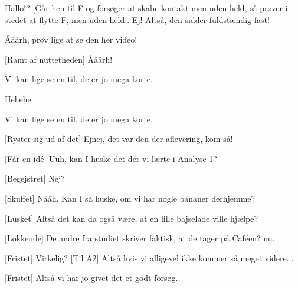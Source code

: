 \documentclass[a4paper,11pt]{article}
\begin{document}
\begin{sketch}

 Hallo!? [Går hen til F og forsøger at skabe kontakt men uden held, så prøver i stedet at flytte F, men uden held]. Ej! Altså, den sidder fuldstændig fast!

 Ååårh, prøv lige at se den her video!


[Ramt af nuttetheden] Ååårh!


 Vi kan lige se en til, de er jo mega korte.


 Hehehe.

 Vi kan lige se en til, de er jo mega korte.

[Ryster sig ud af det] Ejnej, det var den der aflevering, kom så!


[Får en idé] Uuh, kan I huske det der vi lærte i Analyse 1?

[Begejstret] Nej?


[Skuffet] Nååh. Kan I så huske, om vi har nogle bananer derhjemme?


[Lusket] Altså det kan da også være, at en lille bajselade ville hjælpe?


[Lokkende] De andre fra studiet skriver faktisk, at de tager på Caféen? nu.

[Fristet] Virkelig? [Til A2] Altså hvis vi alligevel ikke kommer så meget videre...


[Fristet] Altså vi har jo givet det et godt forsøg..


\end{sketch}
\end{document}
